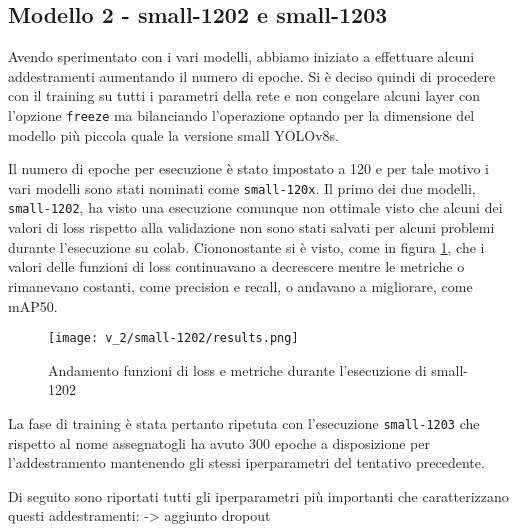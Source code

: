 \subsection*{Modello 2 - small-1202 e small-1203}

Avendo sperimentato con i vari modelli, abbiamo iniziato a effettuare alcuni addestramenti aumentando il
numero di epoche. Si è deciso quindi di procedere con il training su tutti i parametri della rete e non
congelare alcuni layer con l'opzione \verb|freeze| ma bilanciando l'operazione optando per la dimensione
del modello più piccola quale la versione small YOLOv8s. 

Il numero di epoche per esecuzione è stato impostato a 120 e per tale motivo i vari modelli sono stati
nominati come \verb|small-120x|. Il primo dei due modelli, \verb|small-1202|, ha visto una esecuzione 
comunque non ottimale visto che alcuni dei valori di loss rispetto alla validazione non sono stati 
salvati per alcuni problemi durante l'esecuzione su colab. Ciononostante si è visto, come in figura
\ref*{fig:v2-1}, che i valori delle funzioni di loss continuavano a decrescere mentre le metriche
o rimanevano costanti, come precision e recall, o andavano a migliorare, come mAP50.

\begin{figure}[h]
    \centering
    \texttt{[image: v\_2/small-1202/results.png]}
    \caption{Andamento funzioni di loss e metriche durante l'esecuzione di small-1202}
    \label{fig:v2-1}
\end{figure}

La fase di training è stata pertanto ripetuta con l'esecuzione \verb|small-1203| che rispetto al nome assegnatogli
ha avuto 300 epoche a disposizione per l'addestramento mantenendo gli stessi iperparametri del tentativo precedente.

Di seguito sono riportati tutti gli iperparametri più importanti che caratterizzano questi addestramenti:
-> aggiunto dropout



